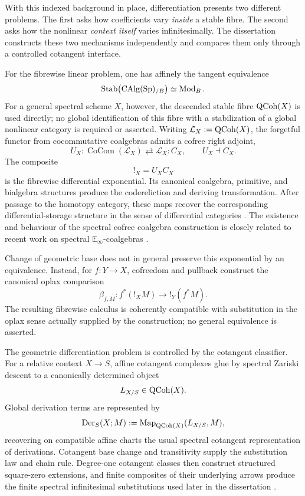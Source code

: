 With this indexed background in place, differentiation presents two different
problems.  The first asks how coefficients vary \emph{inside} a stable fibre.
The second asks how the nonlinear \emph{context itself} varies
infinitesimally.  The dissertation constructs these two mechanisms
independently and compares them only through a controlled cotangent
interface.

For the fibrewise linear problem, one has affinely the tangent equivalence
\[
    \operatorname{Stab}\bigl(\operatorname{CAlg}(\operatorname{Sp})_{/B}\bigr)
    \simeq
    \operatorname{Mod}_B.
\]
For a general spectral scheme \(X\), however, the descended stable fibre
\(\operatorname{QCoh}(X)\) is used directly; no global identification of this fibre with a
stabilization of a global nonlinear category is required or asserted.  Writing
\(\mathcal L_X:=\operatorname{QCoh}(X)\), the forgetful functor from cocommutative
coalgebras admits a cofree right adjoint,
\[
    U_X:
    \operatorname{CoCom}(\mathcal L_X)
    \rightleftarrows
    \mathcal L_X:C_X,
    \qquad
    U_X\dashv C_X.
\]
The composite
\[
    !_X=U_XC_X
\]
is the fibrewise differential exponential.  Its canonical coalgebra,
primitive, and bialgebra structures produce the codereliction and deriving
transformation.  After passage to the homotopy category, these maps recover
the corresponding differential-storage structure in the sense of
differential categories
\cite{Benton1995LNL,BluteCockettSeely2006Differential,EhrhardRegnier2003Differential,Lemay2021Coderelictions}.
The existence and behaviour of the spectral cofree coalgebra construction is
closely related to recent work on spectral
\(\mathbb E_\infty\)-coalgebras
\cite{BachmannBurklund2026Coalgebras}.

Change of geometric base does not in general preserve this exponential by an
equivalence.  Instead, for \(f:Y\to X\), cofreedom and pullback construct the
canonical oplax comparison
\[
    \beta_{f,M}:f^*(!_XM)\longrightarrow !_Y(f^*M).
\]
The resulting fibrewise calculus is coherently compatible with substitution
in the oplax sense actually supplied by the construction; no general
equivalence is asserted.

The geometric differentiation problem is controlled by the cotangent
classifier.  For a relative context \(X\to S\), affine cotangent complexes
glue by spectral Zariski descent to a canonically determined object
\[
    L_{X/S}\in\operatorname{QCoh}(X).
\]
Global derivation terms are represented by
\[
    \operatorname{Der}_S(X;M)
    :=
    \operatorname{Map}_{\operatorname{QCoh}(X)}(L_{X/S},M),
\]
recovering on compatible affine charts the usual spectral cotangent
representation of derivations.  Cotangent base change and transitivity supply
the substitution law and chain rule.  Degree-one cotangent classes then
construct structured square-zero extensions, and finite composites of their
underlying arrows produce the finite spectral infinitesimal substitutions
used later in the dissertation
\cite{LurieDAGIV,LurieHigherAlgebra}.

